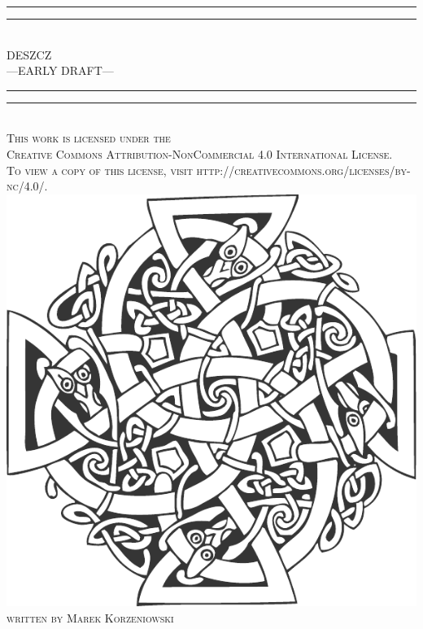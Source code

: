 \documentclass[9pt,openany,titlepage]{extbook}
\begin{document}
	\begin{titlepage}
		\centering
		\vspace*{\baselineskip}
		\rule{\textwidth}{1.6pt}\vspace*{-\baselineskip}\vspace*{2pt}
		\rule{\textwidth}{0.4pt}\\[\baselineskip]{
			\LARGE DESZCZ \\[0.3\baselineskip] ---EARLY DRAFT---
		}\\[0.2\baselineskip]
		\rule{\textwidth}{0.4pt}\vspace*{-\baselineskip}\vspace{3.2pt}
		\rule{\textwidth}{1.6pt}\\[\baselineskip]
		\scshape 
		This work is licensed under the\\
		Creative Commons Attribution-NonCommercial 4.0 International License.\\
		To view a copy of this license, visit http://creativecommons.org/licenses/by-nc/4.0/. \\[\baselineskip] 
		\vspace*{4\baselineskip}
		\includegraphics[height=0.5\textheight]{ornament.pdf} 
		\vfill{\scshape written by Marek Korzeniowski} \\[0.3\baselineskip]
	\end{titlepage}
	\thispagestyle{empty}
	\cleardoublepage
\end{document}
